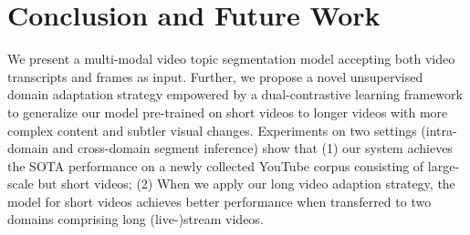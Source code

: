 \documentclass[runningheads]{llncs}
\begin{document}
\iffalse
\vspace{-2ex}
\begin{figure}
\setlength{\belowcaptionskip}{-5pt}
    \centering
    \texttt{[image: samples/case\_v3.png]}
    \caption{Comparison of segment boundary predictions by different settings of our proposal (\textit{Ours} in Table~\ref{tab:res_cross}) on the Behance example in Figure~\ref{fig:behance_example}. Our long video adaption strategy (Window+CL-Dual) recalls the most ground truth boundaries.}
    \label{fig:case_study}
\end{figure}
\fi

\vspace{-1ex}
\section{Conclusion and Future Work}
We present a multi-modal video topic segmentation model accepting both video transcripts and frames as input. %
Further, we propose a novel unsupervised domain adaptation strategy %
empowered by a dual-contrastive learning framework to generalize our model pre-trained on short videos to longer videos with more complex content %
and subtler visual changes. 
Experiments on two settings (intra-domain and cross-domain segment inference) show that (1) our system achieves the %
SOTA performance on a %
newly collected YouTube corpus consisting of large-scale but short videos; (2) When we apply our %
long video adaption strategy, %
the model for short videos %
achieves better performance when transferred to two domains comprising long (live-)stream videos. %


%
%
%


%
\end{document}
